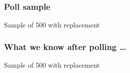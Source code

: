 \documentclass[handout]{beamer}
\begin{document}
   \begin{frame}
   \frametitle{Poll sample}
   \begin{center}
   \end{center}
   Sample of 500 with replacement
   \end{frame}



   \begin{frame}
   \frametitle{What we know after polling \dots}
   \begin{center}
   \end{center}
   Sample of 500 with replacement
   \end{frame}

\end{document}
